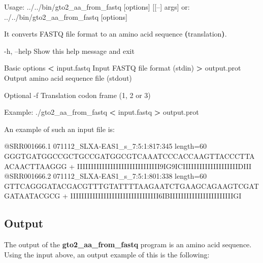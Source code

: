 \documentclass[11pt,]{krantz}
\newenvironment{Shaded}{\begin{snugshade}}{\end{snugshade}}
\newcommand{\KeywordTok}[1]{\textcolor[rgb]{0.27,0.27,0.27}{\textbf{#1}}}
\newcommand{\OperatorTok}[1]{\textcolor[rgb]{0.43,0.43,0.43}{\textbf{#1}}}
\newcommand{\ExtensionTok}[1]{#1}
\newcommand{\NormalTok}[1]{#1}
\begin{document}
\begin{Shaded}
\begin{Highlighting}[]
\ExtensionTok{Usage}\NormalTok{: ../../bin/gto2_aa_from_fastq [options] [[--] args]}
   \ExtensionTok{or}\NormalTok{: ../../bin/gto2_aa_from_fastq [options]}

\ExtensionTok{It}\NormalTok{ converts FASTQ file format to an amino acid sequence }
\KeywordTok{(}\ExtensionTok{translation}\KeywordTok{)}\ExtensionTok{.}

    \ExtensionTok{-h}\NormalTok{, --help      Show this help message and exit}

\ExtensionTok{Basic}\NormalTok{ options}
    \OperatorTok{<} \ExtensionTok{input.fastq}\NormalTok{   Input FASTQ file format (stdin)}
    \OperatorTok{>} \ExtensionTok{output.prot}\NormalTok{   Output amino acid sequence file (stdout)}

\ExtensionTok{Optional}
    \ExtensionTok{-f}\NormalTok{              Translation codon frame (1, 2 or 3)}

\ExtensionTok{Example}\NormalTok{: ./gto2_aa_from_fastq }\OperatorTok{<}\NormalTok{ input.fastq }\OperatorTok{>}\NormalTok{ output.prot}
\end{Highlighting}
\end{Shaded}

An example of such an input file is:

\begin{Shaded}
\begin{Highlighting}[]
\ExtensionTok{@SRR001666.1}\NormalTok{ 071112_SLXA-EAS1_s_7:5:1:817:345 length=60}
\ExtensionTok{GGGTGATGGCCGCTGCCGATGGCGTCAAATCCCACCAAGTTACCCTTAACAACTTAAGGG}
\ExtensionTok{+}
\ExtensionTok{IIIIIIIIIIIIIIIIIIIIIIIIIIIIII9IG9ICIIIIIIIIIIIIIIIIIIIIDIII}
\ExtensionTok{@SRR001666.2}\NormalTok{ 071112_SLXA-EAS1_s_7:5:1:801:338 length=60}
\ExtensionTok{GTTCAGGGATACGACGTTTGTATTTTAAGAATCTGAAGCAGAAGTCGATGATAATACGCG}
\ExtensionTok{+}
\ExtensionTok{IIIIIIIIIIIIIIIIIIIIIIIIIIIIIIII6IBIIIIIIIIIIIIIIIIIIIIIIIGI}
\end{Highlighting}
\end{Shaded}

\subsection*{Output}\label{output-30}


The output of the \textbf{gto2\_aa\_from\_fastq} program is an amino
acid sequence. Using the input above, an output example of this is the
following:
\end{document}
